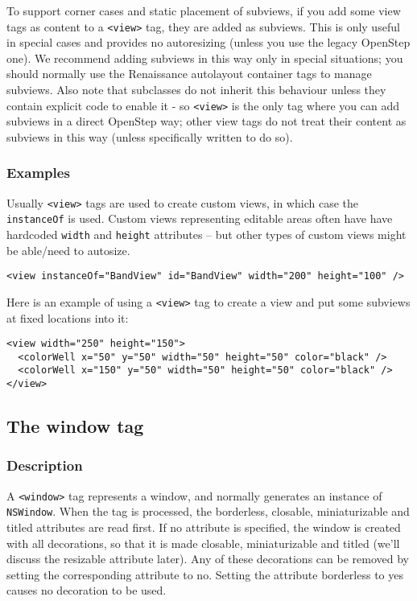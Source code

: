 To support corner cases and static placement of subviews, if you add
some view tags as content to a \texttt{<view>} tag, they are added as
subviews.  This is only useful in special cases and provides no
autoresizing (unless you use the legacy OpenStep one).  We recommend
adding subviews in this way only in special situations; you should
normally use the Renaissance autolayout container tags to manage
subviews.  Also note that subclasses do not inherit this behaviour
unless they contain explicit code to enable it - so \texttt{<view>} is
the only tag where you can add subviews in a direct OpenStep way;
other view tags do not treat their content as subviews in this way
(unless specifically written to do so).

\subsubsection{Examples}
Usually \texttt{<view>} tags are used to create custom views, in which
case the \texttt{instanceOf} is used.  Custom views representing
editable areas often have have hardcoded \texttt{width} and
\texttt{height} attributes -- but other types of custom views might
be able/need to autosize.
\begin{verbatim}
<view instanceOf="BandView" id="BandView" width="200" height="100" />
\end{verbatim}

Here is an example of using a \texttt{<view>} tag to create a view and
put some subviews at fixed locations into it:
\begin{verbatim}
<view width="250" height="150">
  <colorWell x="50" y="50" width="50" height="50" color="black" />
  <colorWell x="150" y="50" width="50" height="50" color="black" />
</view>
\end{verbatim}

\subsection{The window tag}
\subsubsection{Description}
A \texttt{<window>} tag represents a window, and normally generates an
instance of \texttt{NSWindow}.  When the tag is processed, the
borderless, closable, miniaturizable and titled attributes are read
first.  If no attribute is specified, the window is created with all
decorations, so that it is made closable, miniaturizable and titled
(we'll discuss the resizable attribute later).  Any of these
decorations can be removed by setting the corresponding attribute to
no.  Setting the attribute borderless to yes causes no decoration to
be used.


